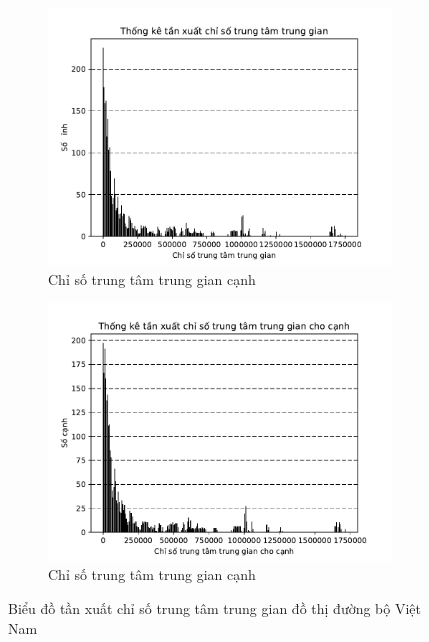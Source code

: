 \documentclass[14pt, oneside, a4paper, openany]{scrartcl}
\begin{document}
\begin{figure}
	\centering
	\begin{subfigure}{.5\textwidth}
		\centering
		\includegraphics[scale=0.5]{figures/betweeness_dist.pdf}
		\caption{Chỉ số trung tâm trung gian cạnh}
		\label{fig:betweenessdist}
	\end{subfigure}%
	\begin{subfigure}{.5\textwidth}
		\centering
		\includegraphics[scale=0.5]{figures/betweeness_edge_dist.pdf}
		\caption{Chỉ số trung tâm trung gian cạnh}
		\label{fig:betweenessedgedist}
	\end{subfigure}
	\caption{Biểu đồ tần xuất chỉ số trung tâm trung gian đồ thị đường bộ Việt Nam}
	\label{fig:between}
\end{figure}
\end{document}
